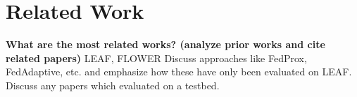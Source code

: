 \section{Related Work}
    \textbf{What are the most related works? (analyze prior works and cite related papers)}
    LEAF, FLOWER
    Discuss approaches like FedProx, FedAdaptive, etc. and emphasize how these have only been evaluated on LEAF.
    Discuss any papers which evaluated on a testbed.